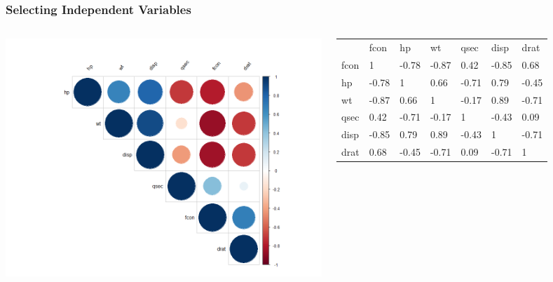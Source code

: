 \documentclass[aspectratio=169]{beamer}
\begin{document}
\begin{frame}
\frametitle{Selecting Independent Variables}

\begin{columns}

\includegraphics[height=.8\textheight]{correlogram}


\scriptsize
\begin{table}[]
\begin{tabular}{lllllll}
     & fcon  & hp    & wt    & qsec  & disp  & drat  \\
fcon & 1     & -0.78 & -0.87 & 0.42  & -0.85 & 0.68  \\
hp   & -0.78 & 1     & 0.66  & -0.71 & 0.79  & -0.45 \\
wt   & -0.87 & 0.66  & 1     & -0.17 & 0.89  & -0.71 \\
qsec & 0.42  & -0.71 & -0.17 & 1     & -0.43 & 0.09  \\
disp & -0.85 & 0.79  & 0.89  & -0.43 & 1     & -0.71 \\
drat & 0.68  & -0.45 & -0.71 & 0.09  & -0.71 & 1    
\end{tabular}
\end{table}

\end{columns}

\end{frame}
\end{document}
